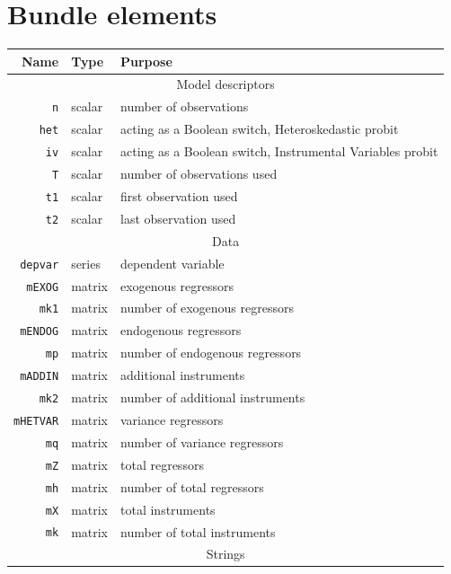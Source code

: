 \documentclass[a4paper,10pt]{article}
\newcounter{script}[section]
\begin{document}
\section{Bundle elements}
\label{sec:bundle_struct}
\begin{footnotesize}
\begin{tabular}{rlp{}}
  \hline
  \textbf{Name} & \textbf{Type} & \textbf{Purpose} \\
  \hline
  \multicolumn{3}{c}{Model descriptors} \\
  \hline
  \texttt{n}    & scalar  & number of observations \\
  \texttt{het}  & scalar  & acting as a Boolean switch,
  Heteroskedastic probit \\
  \texttt{iv}   & scalar  & acting as a Boolean switch, 
  Instrumental Variables probit \\
  \texttt{T}    & scalar  & number of observations used \\
  \texttt{t1}   & scalar  & first observation used \\
  \texttt{t2}   & scalar  & last observation used \\
  \hline
  \multicolumn{3}{c}{Data} \\
  \hline
  \texttt{depvar} & series  & dependent variable \\
  \texttt{mEXOG}  & matrix  & exogenous regressors \\
  \texttt{mk1}    & matrix  & number of exogenous regressors \\
  \texttt{mENDOG} & matrix  & endogenous regressors \\
  \texttt{mp}     & matrix  & number of endogenous regressors \\
  \texttt{mADDIN} & matrix  & additional instruments \\
  \texttt{mk2}    & matrix  & number of additional instruments \\
  \texttt{mHETVAR}& matrix  & variance regressors \\
  \texttt{mq}     & matrix  & number of variance regressors \\
  \texttt{mZ}     & matrix  & total regressors \\
  \texttt{mh}     & matrix  & number of total regressors \\
  \texttt{mX}     & matrix  & total instruments \\
  \texttt{mk}     & matrix  & number of total instruments \\
  \hline
  \multicolumn{3}{c}{Strings} \\

\end{tabular}
\end{footnotesize}
\end{document}
